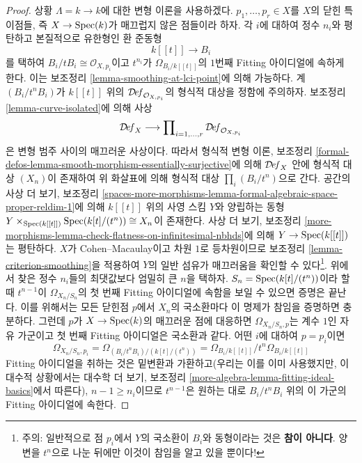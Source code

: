 \begin{proof}
\medskip\noindent
상황 $\Lambda = k \to k$에 대한 변형 이론을 사용하겠다.
$p_1, \ldots, p_r \in X$를 $X$의 닫힌 특이점들, 즉
$X \to \mathop{\mathrm{Spec}}(k)$가 매끄럽지 않은 점들이라 하자. 각 $i$에 대하여 정수
$n_i$와 평탄하고 본질적으로 유한형인 환 준동형
$$
k[[t]] \longrightarrow B_i
$$
를 택하여 $B_i/tB_i \cong \mathcal{O}_{X, p_i}$이고 $t^{n_i}$가
$\Omega_{B_i/k[[t]]}$의 $1$번째 Fitting 아이디얼에 속하게 한다.
이는 보조정리 \ref{lemma-smoothing-at-lci-point}에 의해 가능하다. 계
$(B_i/t^nB_i)$가 $k[[t]]$ 위의
$\mathcal{D}\!\mathit{ef}_{\mathcal{O}_{X, p_i}}$의 형식적 대상을 정함에
주의하자. 보조정리 \ref{lemma-curve-isolated}에 의해 사상
$$
\mathcal{D}\!\mathit{ef}_X
\longrightarrow
\prod\nolimits_{i = 1, \ldots, r} \mathcal{D}\!\mathit{ef}_{\mathcal{O}_{X, p_i}}
$$
은 변형 범주 사이의 매끄러운 사상이다. 따라서 형식적 변형 이론,
보조정리 \ref{formal-defos-lemma-smooth-morphism-essentially-surjective}에
의해 $\mathcal{D}\!\mathit{ef}_X$ 안에 형식적 대상 $(X_n)$이 존재하여 위
화살표에 의해 형식적 대상 $\prod_i (B_i/t^n)$으로 간다. 공간의 사상 더
보기, 보조정리
\ref{spaces-more-morphisms-lemma-formal-algebraic-space-proper-reldim-1}에
의해 $k[[t]]$ 위의 사영 스킴 $Y$와 양립하는 동형
$Y \times_{\mathop{\mathrm{Spec}}(k[[t]])} \mathop{\mathrm{Spec}}(k[t]/(t^n)) \cong X_n$이 존재한다.
사상 더 보기, 보조정리
\ref{more-morphisms-lemma-check-flatness-on-infinitesimal-nbhds}에 의해
$Y \to \mathop{\mathrm{Spec}}(k[[t]])$는 평탄하다.
$X$가 Cohen--Macaulay이고 차원 $1$로 등차원이므로 보조정리
\ref{lemma-criterion-smoothing}을 적용하여 $Y$의 일반 섬유가 매끄러움을
확인할 수 있다\footnote{주의: 일반적으로 점 $p_i$에서 $Y$의 국소환이
$B_i$와 동형이라는 것은 {\bf 참이 아니다}. 양변을 $t^n$으로 나눈 뒤에만
이것이 참임을 알고 있을 뿐이다!}. 위에서 찾은 정수 $n_i$들의 최댓값보다
엄밀히 큰 $n$을 택하자. $S_n = \mathop{\mathrm{Spec}}(k[t]/(t^n))$이라 할 때
$t^{n - 1}$이 $\Omega_{X_n/S_n}$의 첫 번째 Fitting 아이디얼에 속함을
보일 수 있으면 증명은 끝난다. 이를 위해서는 모든 닫힌점 $p$에서
$X_n$의 국소환마다 이 명제가 참임을 증명하면 충분하다. 그런데 $p$가
$X \to \mathop{\mathrm{Spec}}(k)$의 매끄러운 점에 대응하면 $\Omega_{X_n/S_n, p}$는 계수
$1$인 자유 가군이고 첫 번째 Fitting 아이디얼은 국소환과 같다. 어떤
$i$에 대하여 $p = p_i$이면
$$
\Omega_{X_n/S_n, p_i} =
\Omega_{(B_i/t^nB_i)/(k[t]/(t^n))} =
\Omega_{B_i/k[[t]]}/t^n\Omega_{B_i/k[[t]]}
$$
Fitting 아이디얼을 취하는 것은 밑변환과 가환하고(우리는 이를 이미
사용했지만, 이 대수적 상황에서는 대수학 더 보기, 보조정리
\ref{more-algebra-lemma-fitting-ideal-basics}에서 따른다),%
$n - 1 \geq n_i$이므로 $t^{n - 1}$은 원하는 대로 $B_i/t^nB_i$ 위의
이 가군의 Fitting 아이디얼에 속한다.
\end{proof}

